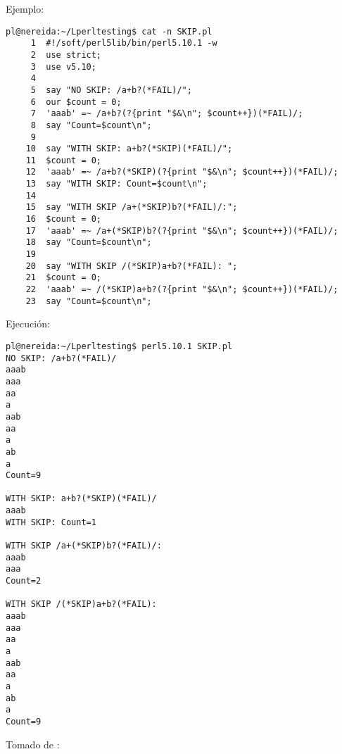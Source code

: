 Ejemplo:

\begin{verbatim}
pl@nereida:~/Lperltesting$ cat -n SKIP.pl
     1  #!/soft/perl5lib/bin/perl5.10.1 -w
     2  use strict;
     3  use v5.10;
     4
     5  say "NO SKIP: /a+b?(*FAIL)/";
     6  our $count = 0;
     7  'aaab' =~ /a+b?(?{print "$&\n"; $count++})(*FAIL)/;
     8  say "Count=$count\n";
     9
    10  say "WITH SKIP: a+b?(*SKIP)(*FAIL)/";
    11  $count = 0;
    12  'aaab' =~ /a+b?(*SKIP)(?{print "$&\n"; $count++})(*FAIL)/;
    13  say "WITH SKIP: Count=$count\n";
    14
    15  say "WITH SKIP /a+(*SKIP)b?(*FAIL)/:";
    16  $count = 0;
    17  'aaab' =~ /a+(*SKIP)b?(?{print "$&\n"; $count++})(*FAIL)/;
    18  say "Count=$count\n";
    19
    20  say "WITH SKIP /(*SKIP)a+b?(*FAIL): ";
    21  $count = 0;
    22  'aaab' =~ /(*SKIP)a+b?(?{print "$&\n"; $count++})(*FAIL)/;
    23  say "Count=$count\n";
\end{verbatim}

Ejecución:

\begin{verbatim}
pl@nereida:~/Lperltesting$ perl5.10.1 SKIP.pl
NO SKIP: /a+b?(*FAIL)/
aaab
aaa
aa
a
aab
aa
a
ab
a
Count=9

WITH SKIP: a+b?(*SKIP)(*FAIL)/
aaab
WITH SKIP: Count=1

WITH SKIP /a+(*SKIP)b?(*FAIL)/:
aaab
aaa
Count=2

WITH SKIP /(*SKIP)a+b?(*FAIL):
aaab
aaa
aa
a
aab
aa
a
ab
a
Count=9
\end{verbatim}


Tomado de :

